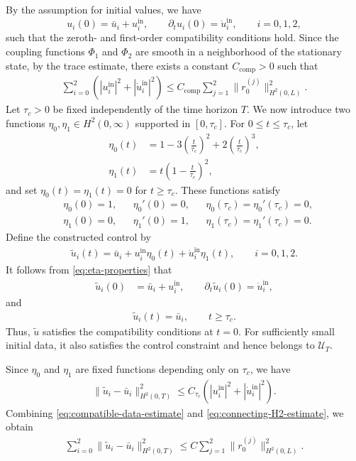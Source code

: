 \documentclass[12pt]{article}
\numberwithin{equation}{section}
\begin{document}
By the assumption for initial values, we have
\[
u_i(0) = \bar{u}_i+u_i^{\mathrm{in}},\qquad \partial_t u_i(0)=\dot u_i^{\mathrm{in}},
\qquad i=0,1,2,
\]  
such that the zeroth- and first-order compatibility conditions hold.
Since the coupling functions $\Phi_1$ and $\Phi_2$ are smooth in a
neighborhood of the stationary state, by the trace estimate, there exists a
constant $C_{\mathrm{comp}}>0$ such that
\begin{align}
\sum_{i=0}^2
\left(
|u_i^{\mathrm{in}}|^2
+
|\dot u_i^{\mathrm{in}}|^2
\right)
\leq
C_{\mathrm{comp}}
\sum_{j=1}^2
\|r_0^{(j)}\|_{H^2(0,L)}^2.
\label{eq:compatible-data-estimate}
\end{align} 
Let $\tau_c>0$ be fixed independently of the time horizon $T$.
We now introduce two functions $\eta_0,\eta_1\in H^2(0,\infty)$
supported in $[0,\tau_c]$. For $0\leq t\leq\tau_c$, let
\begin{align}
\eta_0(t)
&=
1-3\left(\frac{t}{\tau_c}\right)^2
+2\left(\frac{t}{\tau_c}\right)^3,
\label{eq:eta0}\\
\eta_1(t)
&=
t\left(1-\frac{t}{\tau_c}\right)^2,
\label{eq:eta1}
\end{align}
and set $\eta_0(t)=\eta_1(t)=0$ for $t\geq\tau_c$. These functions
satisfy
\begin{align}
&\eta_0(0)=1,
&&\eta_0'(0)=0,
&&\eta_0(\tau_c)=\eta_0'(\tau_c)=0,
\nonumber\\[2mm]
&\eta_1(0)=0,
&&\eta_1'(0)=1,
&&\eta_1(\tau_c)=\eta_1'(\tau_c)=0.
\label{eq:eta-properties}
\end{align}
Define the constructed control by
\begin{align}
\widetilde u_i(t)
=
\bar u_i
+
 u_i^{\mathrm{in}} \eta_0(t)
+
\dot u_i^{\mathrm{in}}\eta_1(t),
\qquad i=0,1,2.
\label{eq:connecting-control}
\end{align}
It follows from \eqref{eq:eta-properties} that
\begin{align}
\widetilde u_i(0)
&=\bar{u}_i+u_i^{\mathrm{in}},
\qquad
\partial_t\widetilde u_i(0)
 =\dot u_i^{\mathrm{in}},
\label{eq:connecting-initial}
\end{align}
and
\begin{align}
\widetilde u_i(t)=\bar u_i,
\qquad
t\geq\tau_c.
\label{eq:connecting-stationary}
\end{align}
Thus, $\widetilde u$ satisfies the compatibility conditions at
$t=0$. For sufficiently small initial data, it also satisfies the
control constraint and hence belongs to $\mathcal U_T$.

Since $\eta_0$ and $\eta_1$ are fixed functions depending only on
$\tau_c$, we have
\begin{align}
\|\widetilde u_i-\bar u_i\|_{H^2(0,T)}^2
\leq
C_{\tau_c}
\left(
|u_i^{\mathrm{in}} |^2
+
|\dot u_i^{\mathrm{in}}|^2
\right).
\label{eq:connecting-H2-estimate}
\end{align}
Combining \eqref{eq:compatible-data-estimate} and
\eqref{eq:connecting-H2-estimate}, we obtain
\begin{align}
\sum_{i=0}^2
\|\widetilde u_i-\bar u_i\|_{H^2(0,T)}^2
\leq
C
\sum_{j=1}^2
\|r_0^{(j)}\|_{H^2(0,L)}^2.
\label{eq:connecting-control-cost}
\end{align}
\end{document}
